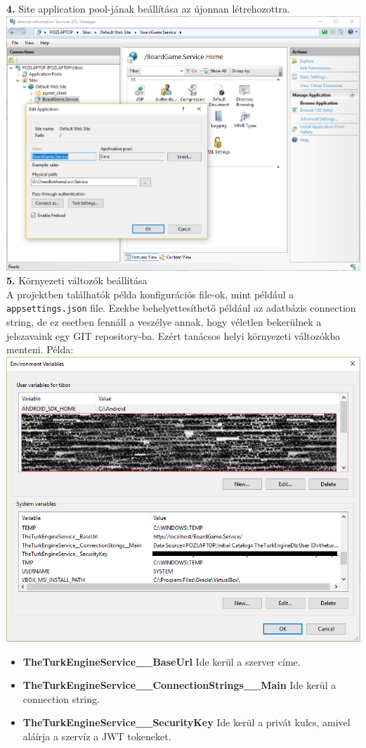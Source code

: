 \documentclass[twoside, a4paper, 12pt]{book}
\begin{document}
\noindent \textbf{4.} Site application pool-jának beállítása az újonnan létrehozottra.
\includegraphics[width=1.0\textwidth]{img/server_dev_run_3.png} \\

\noindent \textbf{5.} Környezeti változók beállítása \\
A projektben találhatók példa konfigurációs file-ok, mint például a \texttt{appsettings.json} file. Ezekbe behelyettesíthető például az adatbázis connection string, de ez esetben fennáll a veszélye annak, hogy véletlen bekerülnek a jelszavaink egy GIT repository-ba. Ezért tanácsos helyi környezeti változókba menteni. Példa:
\includegraphics[width=1.0\textwidth]{img/server_dev_run_4.png}
\begin{itemize}
	\item \textbf{TheTurkEngineService\_\_BaseUrl} Ide kerül a szerver címe.
	\item \textbf{TheTurkEngineService\_\_ConnectionStrings\_\_Main} Ide kerül a connection string.
	\item \textbf{TheTurkEngineService\_\_SecurityKey} Ide kerül a privát kulcs, amivel aláírja a szervíz a JWT tokeneket.
\end{itemize}
\end{document}
